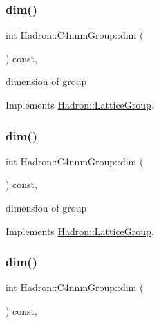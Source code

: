 \subsubsection{\texorpdfstring{dim()}{dim()}\hspace{0.1cm}{\footnotesize\ttfamily [1/3]}}
{\footnotesize\ttfamily int Hadron\+::\+C4nnm\+Group\+::dim (\begin{DoxyParamCaption}{ }\end{DoxyParamCaption}) const\hspace{0.3cm}{\ttfamily [inline]}, {\ttfamily [virtual]}}

dimension of group 

Implements \mbox{\hyperlink{structHadron_1_1LatticeGroup_abd8415698323796ef6a8605796ee3bea}{Hadron\+::\+Lattice\+Group}}.

\mbox{\label{structHadron_1_1C4nnmGroup_ab40f44381ee83db2364e43bc2c3521e4}} 
\subsubsection{\texorpdfstring{dim()}{dim()}\hspace{0.1cm}{\footnotesize\ttfamily [2/3]}}
{\footnotesize\ttfamily int Hadron\+::\+C4nnm\+Group\+::dim (\begin{DoxyParamCaption}{ }\end{DoxyParamCaption}) const\hspace{0.3cm}{\ttfamily [inline]}, {\ttfamily [virtual]}}

dimension of group 

Implements \mbox{\hyperlink{structHadron_1_1LatticeGroup_abd8415698323796ef6a8605796ee3bea}{Hadron\+::\+Lattice\+Group}}.

\mbox{\label{structHadron_1_1C4nnmGroup_ab40f44381ee83db2364e43bc2c3521e4}} 
\subsubsection{\texorpdfstring{dim()}{dim()}\hspace{0.1cm}{\footnotesize\ttfamily [3/3]}}
{\footnotesize\ttfamily int Hadron\+::\+C4nnm\+Group\+::dim (\begin{DoxyParamCaption}{ }\end{DoxyParamCaption}) const\hspace{0.3cm}{\ttfamily [inline]}, {\ttfamily [virtual]}}

